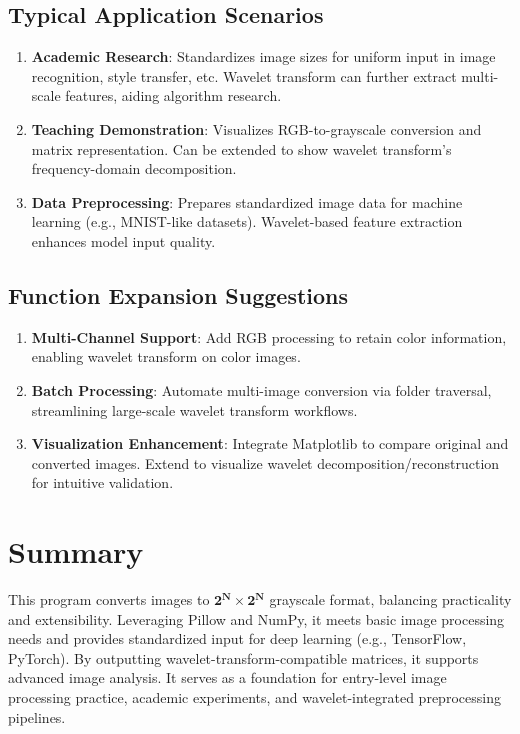\documentclass[12pt,a4paper]{article}
\begin{document}
\subsection{Typical Application Scenarios}
\begin{enumerate}
    \item \textbf{Academic Research}: Standardizes image sizes for uniform input in image recognition, style transfer, etc. Wavelet transform can further extract multi-scale features, aiding algorithm research.  
    \item \textbf{Teaching Demonstration}: Visualizes RGB-to-grayscale conversion and matrix representation. Can be extended to show wavelet transform’s frequency-domain decomposition.  
    \item \textbf{Data Preprocessing}: Prepares standardized image data for machine learning (e.g., MNIST-like datasets). Wavelet-based feature extraction enhances model input quality.  
\end{enumerate}

\subsection{Function Expansion Suggestions}
\begin{enumerate}
    \item \textbf{Multi-Channel Support}: Add RGB processing to retain color information, enabling wavelet transform on color images.  
    \item \textbf{Batch Processing}: Automate multi-image conversion via folder traversal, streamlining large-scale wavelet transform workflows.  
    \item \textbf{Visualization Enhancement}: Integrate Matplotlib to compare original and converted images. Extend to visualize wavelet decomposition/reconstruction for intuitive validation.  
\end{enumerate}


\section{Summary}
This program converts images to \(\mathbf{2^N \times 2^N}\) grayscale format, balancing practicality and extensibility. Leveraging Pillow and NumPy, it meets basic image processing needs and provides standardized input for deep learning (e.g., TensorFlow, PyTorch). By outputting wavelet-transform-compatible matrices, it supports advanced image analysis. It serves as a foundation for entry-level image processing practice, academic experiments, and wavelet-integrated preprocessing pipelines.  
\end{document}
